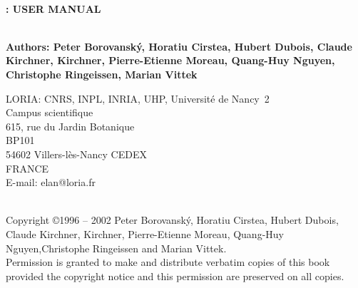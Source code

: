 ~\\
\textbf{\elan{}: USER MANUAL}

~\\
\textbf{Authors:  Peter Borovansk\'y, Horatiu Cirstea, Hubert Dubois, Claude Kirchner,  \Helene{}
Kirchner, Pierre-Etienne Moreau, Quang-Huy Nguyen, Christophe Ringeissen,
Marian Vittek}
\begin{flushleft}
LORIA: CNRS, INPL, INRIA, UHP, Universit{\'e} de Nancy~2\\
Campus scientifique\\
615, rue du Jardin Botanique\\
BP101 \\
54602 Villers-l{\`e}s-Nancy CEDEX\\
FRANCE\\[2mm]
E-mail: elan@loria.fr
\end{flushleft}
~\\
Copyright \copyright 1996 -- 2002 Peter Borovansk\'y, Horatiu Cirstea, 
Hubert Dubois, Claude Kirchner,  \Helene{}
Kirchner, Pierre-Etienne Moreau, Quang-Huy Nguyen,Christophe Ringeissen and
Marian Vittek.\\
Permission is granted to make and distribute verbatim copies of this
book provided the copyright notice and this permission are preserved
on all copies.
